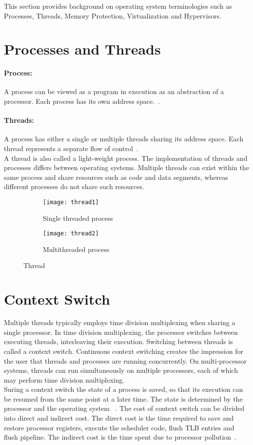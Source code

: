 This section provides background on operating system terminologies such as Processes, Threads, Memory Protection, Virtualization and Hypervisors.
\section{Processes and Threads}
\paragraph{Process:} A process can be viewed as a program in execution as an abstraction of a processor. Each process has its own address space.~\cite{Galvin}.

\paragraph{Threads:} A process has either a single or multiple threads sharing its address space. Each thread represents a separate flow of control~\cite{Galvin}.
\\[3mm]
A thread is also called a light-weight process. The implementation of threads and processes differs between operating systems. Multiple threads can exist within the same process and share resources such as code and data segments, whereas different processes do not share such resources. 
\begin{figure}[!ht]
    \centering
    \begin{subfigure}[b]{0.45\textwidth}
	\texttt{[image: thread1]}
	\caption{Single threaded process}
	\label{fig:thread1}
    \end{subfigure}
	\hfill
    \begin{subfigure}[b]{0.45\textwidth}
	\texttt{[image: thread2]}
	\caption{Multithreaded process}
	\label{fig:thread2}
    \end{subfigure}
    \caption{Thread}\label{fig:threads}
\end{figure}

\section{Context Switch}
Multiple threads typically employs time division multiplexing when sharing a single processor. In time division multiplexing, the processor switches between executing threads, interleaving their execution. Switching between threads is called a context switch. Continuous context switching creates the impression for the user that threads and processes are running concurrently. On multi-processor systems, threads can run simultaneously on multiple processors, each of which may perform time division multiplexing. 
\\[3mm]
Suring a context switch the state of a process is saved, so that its execution can be resumed from the same point at a later time. The state is determined by the processor and the operating system ~\cite{Galvin}. The cost of context switch can be divided into direct and indirect cost. The direct cost is the time required to save and restore processor registers, execute the scheduler code, flush TLB entries and flush pipeline. The indirect cost is the time spent due to processor pollution~\cite{Soares+:osdi10, Li:2007:QCC:1281700.1281702}.

